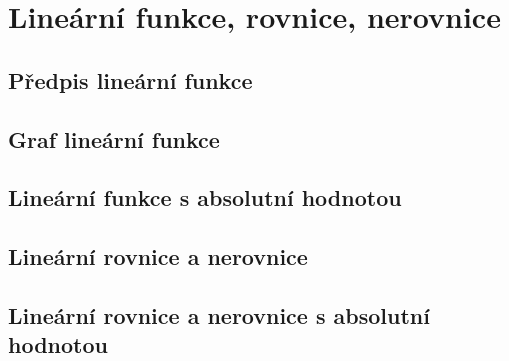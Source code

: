 
\newpage
    \section{Lineární funkce, rovnice, nerovnice}

        \subsection{Předpis lineární funkce}
        \subsection{Graf lineární funkce}
        \subsection{Lineární funkce s absolutní hodnotou}
        \subsection{Lineární rovnice a nerovnice}
        \subsection{Lineární rovnice a nerovnice s absolutní hodnotou}